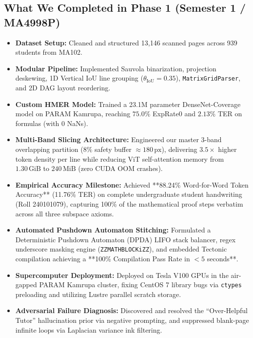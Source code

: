 \subsection{What We Completed in Phase 1 (Semester 1 / MA4998P)}
\begin{itemize}
    \item \textbf{Dataset Setup:} Cleaned and structured 13,146 scanned pages across 939 students from MA102.
    \item \textbf{Modular Pipeline:} Implemented Sauvola binarization, projection deskewing, 1D Vertical IoU line grouping ($\theta_{\text{IoU}} = 0.35$), \texttt{MatrixGridParser}, and 2D DAG layout reordering.
    \item \textbf{Custom HMER Model:} Trained a 23.1M parameter DenseNet-Coverage model on PARAM Kamrupa, reaching $75.0\%$ ExpRate0 and $2.13\%$ TER on formulas (with 0 NaNs).
    \item \textbf{Multi-Band Slicing Architecture:} Engineered our master 3-band overlapping partition ($8\%$ safety buffer $\approx 180\,\text{px}$), delivering $3.5\times$ higher token density per line while reducing ViT self-attention memory from $1.30\,\text{GiB}$ to $240\,\text{MiB}$ (zero CUDA OOM crashes).
    \item \textbf{Empirical Accuracy Milestone:} Achieved **88.24\% Word-for-Word Token Accuracy** (11.76\% TER) on complete undergraduate student handwriting (Roll 240101079), capturing 100\% of the mathematical proof steps verbatim across all three subspace axioms.
    \item \textbf{Automated Pushdown Automaton Stitching:} Formulated a Deterministic Pushdown Automaton (DPDA) LIFO stack balancer, regex underscore masking engine (\texttt{ZZMATHBLOCKiZZ}), and embedded Tectonic compilation achieving a **100\% Compilation Pass Rate in $< 5$ seconds**.
    \item \textbf{Supercomputer Deployment:} Deployed on Tesla V100 GPUs in the air-gapped PARAM Kamrupa cluster, fixing CentOS 7 library bugs via \texttt{ctypes} preloading and utilizing Lustre parallel scratch storage.
    \item \textbf{Adversarial Failure Diagnosis:} Discovered and resolved the ``Over-Helpful Tutor'' hallucination prior via negative prompting, and suppressed blank-page infinite loops via Laplacian variance ink filtering.
\end{itemize}

